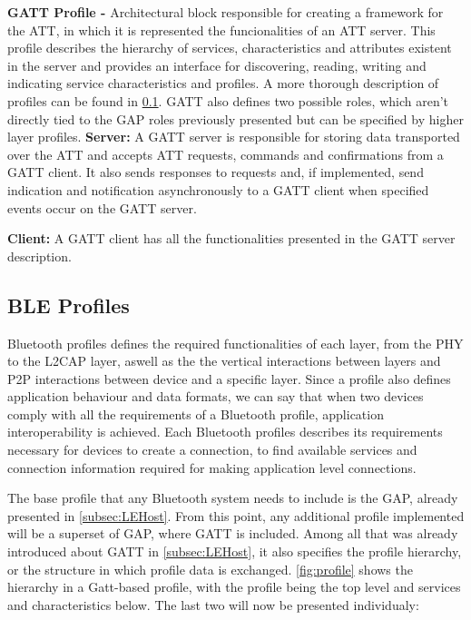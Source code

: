 \textbf{\ac{GATT} Profile -} Architectural block responsible for creating a framework for the \ac{ATT}, in which it is represented the funcionalities of an \ac{ATT} server. This profile describes the hierarchy of services, characteristics and attributes existent in the server and provides an interface for discovering, reading, writing and indicating service characteristics and profiles. A more thorough description of profiles can be found in \ref{subsec:BLEProfile}. \ac{GATT} also defines two possible roles, which aren't directly tied to the \ac{GAP} roles previously presented but can be specified by higher layer profiles.
\tab \textbf{Server:} A \ac{GATT} server is responsible for storing data transported over the \ac{ATT} and accepts \ac{ATT} requests, commands and confirmations from a \ac{GATT} client. It also sends responses to requests and, if implemented, send indication and notification asynchronously to a \ac{GATT} client when specified events occur on the \ac{GATT} server.

\tab \textbf{Client:} A \ac{GATT} client has all the functionalities presented in the \ac{GATT} server description.

\subsection{\ac{BLE} Profiles}
\label{subsec:BLEProfile}


Bluetooth profiles defines the required functionalities of each layer, from the \ac{PHY} to the \ac{L2CAP} layer, aswell as the the vertical interactions between layers and \ac{P2P} interactions between device and a specific layer. Since a profile also defines application behaviour and data formats, we can say that when two devices comply with all the requirements of a Bluetooth profile, application interoperability is achieved. Each Bluetooth profiles describes its requirements necessary for devices to create a connection, to find available services and connection information required for making application level connections.

The base profile that any Bluetooth system needs to include is the \ac{GAP}, already presented in \ref{subsec:LEHost}. From this point, any additional profile implemented will be a superset of \ac{GAP}, where \ac{GATT} is included. Among all that was already introduced about \ac{GATT} in \ref{subsec:LEHost}, it also specifies the profile hierarchy, or the structure in which profile data is exchanged.  \ref{fig:profile} shows the hierarchy in a Gatt-based profile, with the profile being the top level and services and characteristics below. The last two will now be presented individualy:

